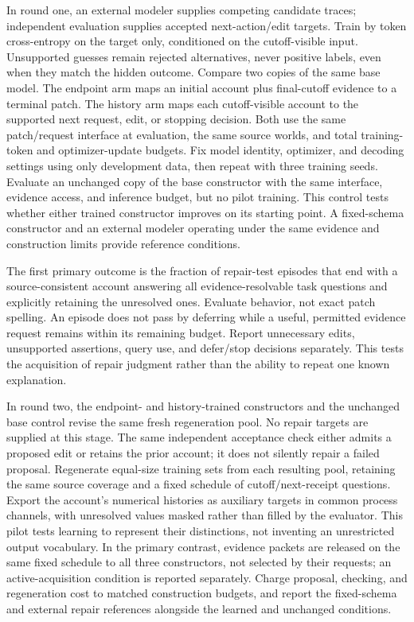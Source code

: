 \documentclass[10pt]{article}
\begin{document}
In round one, an external modeler supplies competing candidate traces;
independent evaluation supplies accepted next-action/edit targets. Train by
token cross-entropy on the target only,
conditioned on the cutoff-visible input. Unsupported guesses remain rejected
alternatives, never positive labels, even when they match the hidden outcome.
Compare two copies of the same base model. The endpoint arm maps an initial
account plus final-cutoff evidence to a terminal patch. The history arm maps
each cutoff-visible account to the supported next request, edit, or stopping
decision. Both use the same patch/request interface at evaluation, the same
source worlds, and total
training-token and optimizer-update budgets. Fix model identity, optimizer,
and decoding settings using only development data, then repeat with three
training seeds. Evaluate an unchanged copy of the base constructor with the
same interface, evidence access, and inference budget, but no pilot training.
This control tests whether either trained constructor improves on its starting
point. A fixed-schema constructor and an external modeler operating
under the same evidence and construction limits provide reference conditions.

The first primary outcome is the fraction of repair-test episodes that end
with a source-consistent account answering all evidence-resolvable task
questions and explicitly retaining the unresolved ones. Evaluate behavior,
not exact patch spelling. An episode does not pass by deferring while a useful,
permitted evidence request remains within its remaining budget. Report unnecessary edits, unsupported assertions,
query use, and defer/stop decisions separately. This tests the acquisition of
repair judgment rather than the ability to repeat one known explanation.

In round two, the endpoint- and history-trained constructors and the unchanged
base control revise the same fresh regeneration pool. No repair targets are supplied at this stage. The
same independent acceptance check either admits a proposed edit or retains
the prior account; it does not silently repair a failed proposal. Regenerate
equal-size training sets from each resulting pool, retaining the same source
coverage and a fixed schedule of cutoff/next-receipt questions. Export the
account's numerical histories as auxiliary targets in common process
channels, with unresolved values masked rather than filled by the evaluator. This
pilot tests learning to represent their distinctions, not inventing an
unrestricted output vocabulary. In the primary contrast, evidence packets are
released on the same fixed schedule to all three constructors, not selected by
their requests; an active-acquisition condition is reported separately.
Charge proposal, checking, and regeneration
cost to matched construction budgets, and report the fixed-schema and external
repair references alongside the learned and unchanged conditions.
\end{document}

